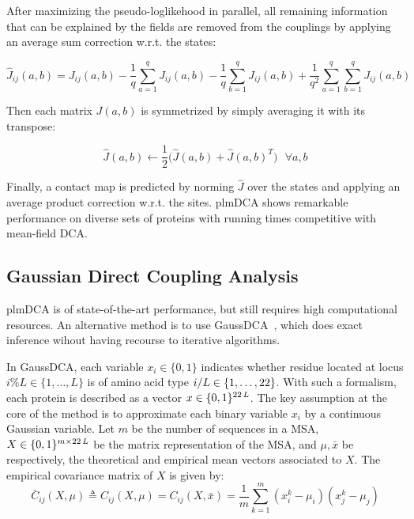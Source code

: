         After maximizing the pseudo-loglikehood in parallel, all remaining information
        that can be explained by the fields are removed from the couplings by applying
        an average sum correction w.r.t. the states:

        \begin{equation}  %
            \hat{J}_{ij}(a, b) = J_{ij}(a, b) - \frac{1}{q} \sum\limits_{a=1}^q J_{ij}(a, b) - \frac{1}{q} \sum\limits_{b=1}^q J_{ij}(a, b)
            + \frac{1}{q^2} \sum\limits_{a=1}^q \sum\limits_{b=1}^q J_{ij}(a, b)
        \end{equation}

        Then each matrix $J(a, b)$ is symmetrized by simply averaging it with its transpose:

        \begin{equation}
            \hat{J}(a, b) \leftarrow \frac{1}{2} \big( \hat{J}(a, b) + \hat{J}(a, b)^T \big) \ \ \ \forall a, b
        \end{equation}

        Finally, a contact map is predicted by norming $\hat{J}$ over the states and applying an average product correction w.r.t. the sites.  %
        plmDCA shows remarkable performance on diverse sets of proteins with running times competitive with mean-field DCA.


    \subsection{Gaussian Direct Coupling Analysis}

        plmDCA is of state-of-the-art performance, but still requires high computational resources.
        An alternative method is to use GaussDCA~\cite{10.1371/journal.pone.0092721}, which does
        exact inference wihout having recourse to iterative algorithms.

        In GaussDCA, each variable $x_i \in \{0, 1\}$ indicates whether residue located at locus $i \% L \in \{ 1, \dotsc, L \}$
        is of amino acid type $i / L \in \{1, \dotsc, 22\}$. With such a formalism, each protein is described as a vector
        $x \in \{0, 1\}^{22\,L}$. The key assumption at the core of the method is to approximate each binary variable $x_i$
        by a continuous Gaussian variable. Let $m$ be the number of sequences in a MSA, $X \in \{0, 1\}^{m \times 22\,L}$
        be the matrix representation of the MSA, and $\mu, \bar{x}$ be respectively, the theoretical and empirical mean vectors associated to $X$.
        The empirical covariance matrix of $X$ is given by:  %
        \begin{equation}
            \bar{C}_{ij}(X, \mu) \triangleq C_{ij}(X, \mu) = C_{ij}(X, \bar{x}) = \frac{1}{m} \sum\limits_{k=1}^m (x_i^k - \mu_i) (x_j^k - \mu_j)
        \end{equation}

